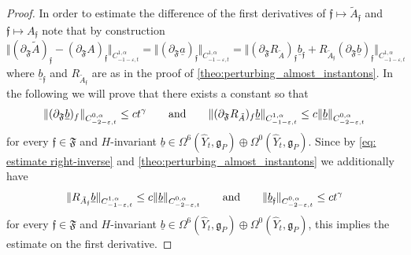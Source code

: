 \documentclass[11pt,a4paper]{scrartcl}
\newcommand{\VertWHt}[3]{\Vert_{C^{{#1},\alpha}_{{#2},t}{#3}}}
\numberwithin{equation}{section}
\theoremstyle{plain}
\theoremstyle{definition}
\theoremstyle{remark}
\begin{document}
\begin{proof}
In order to estimate the difference of the first derivatives of $\mathfrak{f} \mapsto \tilde{A}_{\mathfrak{f}}$ and $\mathfrak{f} \mapsto A_{\mathfrak{f}}$ note that by construction \[\Vert (\partial_{\mathfrak{F}} \tilde{A})_{\mathfrak{f}} - (\partial_{\mathfrak{F}} A)_{\mathfrak{f}} \VertWHt{1}{-1-\varepsilon}{} = \Vert (\partial_\mathfrak{F} \underline{a})_{\mathfrak{f}} \VertWHt{1}{-1-\varepsilon}{} = \Vert (\partial_\mathfrak{F} R_{\tilde{A}})_{\mathfrak{f}} \underline{b}_{\mathfrak{f}} + R_{\tilde{A}_{\mathfrak{f}}} (\partial_\mathfrak{F}\underline{b})_{\mathfrak{f}} \VertWHt{1}{-1-\varepsilon}{} \] where $\underline{b}_{\mathfrak{f}}$ and $R_{\tilde{A}_{\mathfrak{f}}}$ are as in the proof of \autoref{theo:perturbing_almost_instantons}. In the following we will prove that there exists a constant so that 
\begin{equation}\label{equ: auxiliary derivative estimates}
\Vert (\partial_\mathfrak{F}\underline{b})_f \VertWHt{0}{-2-\varepsilon}{} \leq c t^{\gamma} \qquad \textup{and} \qquad \Vert (\partial_\mathfrak{F} R_{\tilde{A}})_f \underline{b}\VertWHt{1}{-1-\varepsilon}{}\leq c \Vert \underline{b}\VertWHt{0}{-2-\varepsilon}{} 
\end{equation} 
for every ${\mathfrak{f}}\in \mathfrak{F}$ and $H$-invariant $\underline{b}\in \Omega^6(\hat{Y}_t,\mathfrak{g}_P)\oplus \Omega^0(\hat{Y}_t,\mathfrak{g}_P)$. Since by \eqref{eq: estimate right-inverse} and \autoref{theo:perturbing_almost_instantons} we additionally have \[\Vert R_{\tilde{A}_{\mathfrak{f}}} \underline{b} \VertWHt{1}{-1-\varepsilon}{}  \leq c \Vert \underline{b}\VertWHt{0}{-2-\varepsilon}{} \qquad \textup{and} \qquad \Vert \underline{b}_{\mathfrak{f}} \VertWHt{0}{-2-\varepsilon}{} \leq c t^\gamma \] for every ${\mathfrak{f}}\in \mathfrak{F}$ and $H$-invariant $\underline{b}\in \Omega^6(\hat{Y}_t,\mathfrak{g}_P)\oplus \Omega^0(\hat{Y}_t,\mathfrak{g}_P)$, this implies the estimate on the first derivative.


\end{proof}
\end{document}
